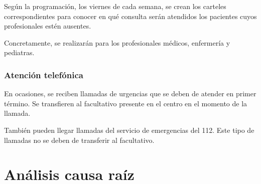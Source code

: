Según la programación, los viernes de cada semana, se crean los carteles correspondientes para conocer en qué consulta serán atendidos los pacientes cuyos profesionales estén ausentes.

Concretamente, se realizarán para los profesionales médicos, enfermería y pediatras.

\subsubsection{Atención telefónica}

En ocasiones, se reciben llamadas de urgencias que se deben de atender en primer término. Se transfieren al facultativo presente en el centro en el momento de la llamada.

También pueden llegar llamadas del servicio de emergencias del 112. Este tipo de llamadas no se deben de transferir al facultativo.

\section{Análisis causa raíz}